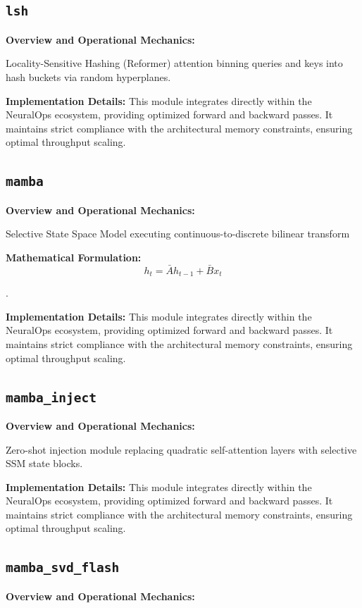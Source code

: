 \documentclass[10pt,twocolumn,letterpaper]{article}
\begin{document}
\subsection{\texttt{lsh}}
\textbf{Overview and Operational Mechanics:}

Locality-Sensitive Hashing (Reformer) attention binning queries and keys into hash buckets via random hyperplanes.

\textbf{Implementation Details:}
This module integrates directly within the NeuralOps ecosystem, providing optimized forward and backward passes. It maintains strict compliance with the architectural memory constraints, ensuring optimal throughput scaling.

\subsection{\texttt{mamba}}
\textbf{Overview and Operational Mechanics:}

Selective State Space Model executing continuous-to-discrete bilinear transform

\textbf{Mathematical Formulation:}
\begin{equation}
h_t = \bar{A} h_{t-1} + \bar{B} x_t
\end{equation}

.

\textbf{Implementation Details:}
This module integrates directly within the NeuralOps ecosystem, providing optimized forward and backward passes. It maintains strict compliance with the architectural memory constraints, ensuring optimal throughput scaling.

\subsection{\texttt{mamba\_inject}}
\textbf{Overview and Operational Mechanics:}

Zero-shot injection module replacing quadratic self-attention layers with selective SSM state blocks.

\textbf{Implementation Details:}
This module integrates directly within the NeuralOps ecosystem, providing optimized forward and backward passes. It maintains strict compliance with the architectural memory constraints, ensuring optimal throughput scaling.

\subsection{\texttt{mamba\_svd\_flash}}
\textbf{Overview and Operational Mechanics:}
\end{document}
